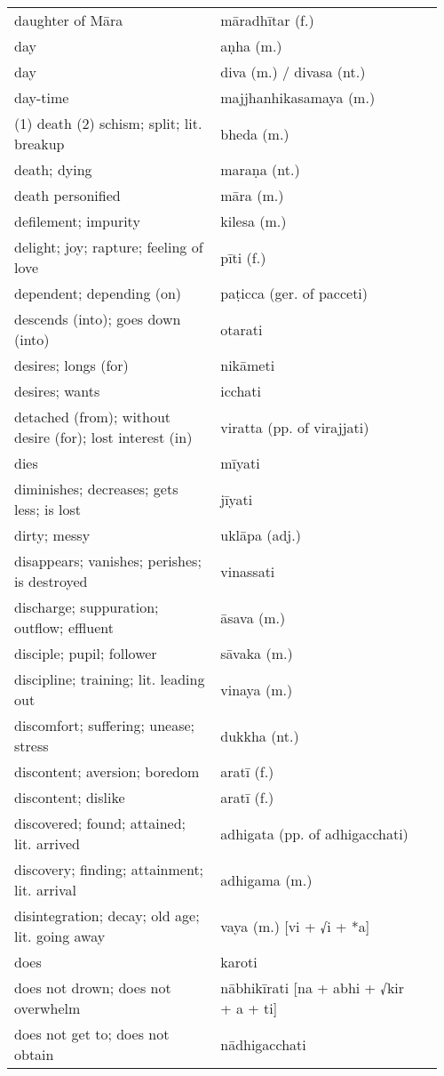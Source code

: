 \documentclass[a5paper]{memoir}
\begin{document}
\begin{longtable}{L{0.48\linewidth} L{0.48\linewidth} H}
daughter of Māra & māradhītar (f.) & \\
day & aṇha (m.) & \\
day & diva (m.) / divasa (nt.) & \\
day-time & majjhanhikasamaya (m.) & \\
(1) death (2) schism; split; lit. breakup & bheda (m.) & \\
death; dying & maraṇa (nt.) & \\
death personified & māra (m.) & \\
defilement; impurity & kilesa (m.) & \\
delight; joy; rapture; feeling of love & pīti (f.) & \\
dependent; depending (on) & paṭicca (ger. of pacceti) & \\
descends (into); goes down (into) & otarati & \\
desires; longs (for) & nikāmeti & \\
desires; wants & icchati & \\
detached (from); without desire (for); lost interest (in) & viratta (pp. of virajjati) & \\
dies & mīyati & \\
diminishes; decreases; gets less; is lost & jīyati & \\
dirty; messy & uklāpa (adj.) & \\
disappears; vanishes; perishes; is destroyed & vinassati & \\
discharge; suppuration; outflow; effluent & āsava (m.) & \\
disciple; pupil; follower & sāvaka (m.) & \\
discipline; training; lit. leading out & vinaya (m.) & \\
discomfort; suffering; unease; stress & dukkha (nt.) & \\
discontent; aversion; boredom & aratī (f.) & \\
discontent; dislike & aratī (f.) & \\
discovered; found; attained; lit. arrived & adhigata (pp. of adhigacchati) & \\
discovery; finding; attainment; lit. arrival & adhigama (m.) & \\
disintegration; decay; old age; lit. going away & vaya (m.) [vi + √i + *a] & \\
does & karoti & \\
does not drown; does not overwhelm & nābhikīrati [na + abhi + √kir + a + ti] & \\
does not get to; does not obtain & nādhigacchati & \\

\end{longtable}
\end{document}
